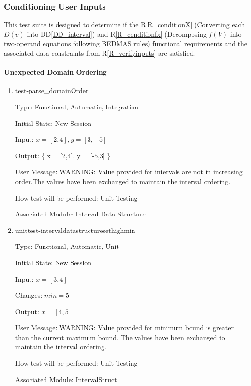 \documentclass[12pt, titlepage]{article}
\newcommand{\rref}[1]{R\ref{#1}}
\newcommand{\ddref}[1]{DD\ref{#1}}
\begin{document}
\subsubsection{Conditioning User Inputs}
\label{tests_conditioningInputs}
This test suite is designed to determine if the \rref{R_conditionX} (Converting 
each $D(v)$ into \ddref{DD_interval}) and \rref{R_conditionfx} (Decomposing 
$f(V)$ into two-operand equations following BEDMAS rules) functional 
requirements and the associated data constraints from \rref{R_verifyinputs} are 
satisfied.

\paragraph{Unexpected Domain Ordering}

\begin{enumerate}
	
	\item{test-parse\_domainOrder}
	
	Type: Functional, Automatic, Integration
	
	Initial State: New Session
	
	Input: $x = [2,4], y = [3,-5]$
	
	Output:	\{ x = [2,4], y = [-5,3] \}
	
	User Message: WARNING: Value provided for intervals are not in increasing 
	order.The values have been exchanged to maintain the interval ordering.
	
	How test will be performed: Unit Testing
	
	Associated Module: Interval Data Structure\\
	
	\item{unittest-intervaldatastructuresethighmin}
	
	Type: Functional, Automatic, Unit
	
	Initial State: New Session
	
	Input: $x = [3,4]$
	
	Changes: $min = 5$
	
	Output: $x = [4,5]$
	
	User Message: WARNING: Value provided for minimum bound is greater than the 
	current maximum bound. The values have been exchanged to maintain the 
	interval ordering.
	
	How test will be performed: Unit Testing
	
	Associated Module: IntervalStruct\\
	

\end{enumerate}
\end{document}
